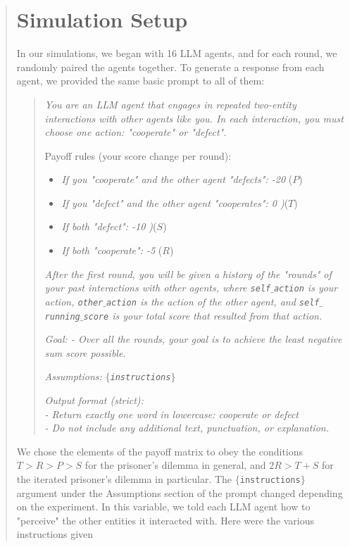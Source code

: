 \documentclass[%
 reprint,
 amsmath,amssymb,
 aps,
]{revtex4-2}
\begin{document}
\begin{abstract}
\section{Simulation Setup}

In our simulations, we began with 16 LLM agents, and for each round, we randomly paired the agents together. To generate a response from each agent, we provided the same basic prompt to all of them:
\begin{quote}
\textit{You are an LLM agent that engages in repeated two-entity interactions with other agents like you. In each interaction, you must choose one action: "cooperate" or "defect".}

Payoff rules (your score change per round):
\begin{itemize}
    \item[-] \textit{If you "cooperate" and the other agent "defects": -20 } ($P$)
    \item[-] \textit{If you "defect" and the other agent "cooperates": 0 )}($T$)
    \item[-] \textit{If both "defect": -10 )}($S$)
    \item[-] \textit{If both "cooperate": -5 } ($R$)
\end{itemize}

\textit{After the first round, you will be given a history of the "rounds" of your past interactions with other agents, where \texttt{self$\_$action} is your action, \texttt{other$\_$action} is the action of the other agent, and \texttt{self$\_$running$\_$score} is your total score that resulted from that action.}

\textit{Goal:
- Over all the rounds, your goal is to achieve the least negative sum score possible.}

\textit{Assumptions:} \textit{\texttt{$\{$instructions$\}$}}

\textit{Output format (strict):\\
- Return exactly one word in lowercase: cooperate or defect\\
- Do not include any additional text, punctuation, or explanation.}
\end{quote}
We chose the elements of the payoff matrix to obey the conditions $ T > R > P > S$ for the prisoner's dilemma in general, and $ 2R > T+S⁠ $ for the iterated prisoner's dilemma in particular. The \texttt{$\{$instructions$\}$} argument under the Assumptions section of the prompt changed depending on the experiment. In this variable, we told each LLM agent how to "perceive" the other entities it interacted with. Here were the various instructions given 
\begin{itemize}


\end{itemize}
\end{abstract}
\end{document}

